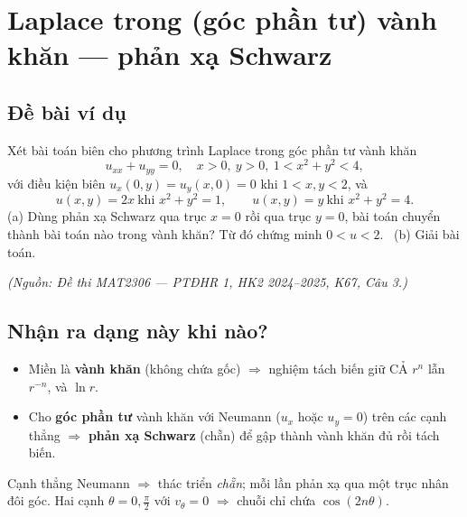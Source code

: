 
\section{Laplace trong (góc phần tư) vành khăn --- phản xạ Schwarz}

\subsection*{Đề bài ví dụ}
Xét bài toán biên cho phương trình Laplace trong góc phần tư vành khăn
\[
  u_{xx}+u_{yy}=0,\quad x>0,\ y>0,\ 1<x^2+y^2<4,
\]
với điều kiện biên $u_x(0,y)=u_y(x,0)=0$ khi $1<x,y<2$, và
\[
  u(x,y)=2x\ \text{khi } x^2+y^2=1,\qquad u(x,y)=y\ \text{khi } x^2+y^2=4.
\]
(a) Dùng phản xạ Schwarz qua trục $x=0$ rồi qua trục $y=0$, bài toán chuyển thành bài toán nào
trong vành khăn? Từ đó chứng minh $0<u<2$. \ (b) Giải bài toán.

\emph{\small(Nguồn: Đề thi MAT2306 --- PTĐHR 1, HK2 2024--2025, K67, Câu 3.)}

\subsection*{Nhận ra dạng này khi nào?}
\begin{itemize}
  \item Miền là \textbf{vành khăn} (không chứa gốc) $\Rightarrow$ nghiệm tách biến giữ CẢ $r^{n}$ lẫn $r^{-n}$, và $\ln r$.
  \item Cho \textbf{góc phần tư} vành khăn với Neumann ($u_x$ hoặc $u_y=0$) trên các cạnh thẳng
  $\Rightarrow$ \textbf{phản xạ Schwarz} (chẵn) để gập thành vành khăn đủ rồi tách biến.
\end{itemize}
\begin{meobox}
Cạnh thẳng Neumann $\Rightarrow$ thác triển \emph{chẵn}; mỗi lần phản xạ qua một trục nhân đôi góc.
Hai cạnh $\theta=0,\tfrac{\pi}{2}$ với $v_\theta=0$ $\Rightarrow$ chuỗi chỉ chứa $\cos(2n\theta)$.
\end{meobox}

